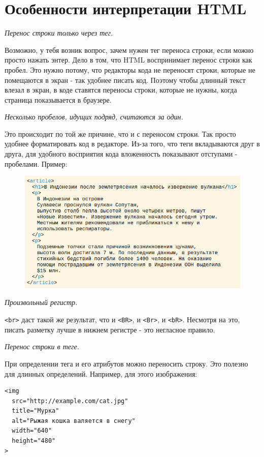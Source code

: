 \documentclass[14pt]{extreport}
\begin{document}
\section{Особенности интерпретации HTML}

\emph{Перенос строки только через тег.}

Возможно, у тебя возник вопрос, зачем нужен тег переноса строки, если можно просто нажать энтер. Дело в том, что HTML воспринимает перенос строки как пробел. Это нужно потому, что редакторы кода не переносят﻿ строки, которые не помещаются в экран - так удобнее писать код. Поэтому чтобы длинный текст влезал в экран, в коде ставятся переносы строки, которые не нужны, когда страница показывается в браузере.

\emph{Несколько пробелов, идущих подряд, считаются за один.}

Это происходит по той же причине, что и с переносом строки. Так просто удобнее форматировать код в редакторе. Из-за того, что теги вкладываются друг в друга, для удобного восприятия кода вложенность показывают отступами - пробелами. Пример:

\begin{figure}[H]
\centerline{\includegraphics[width=0.8\linewidth]{pics_practice/interpretation_HTML.png}}
\caption{}
\label{}
\end{figure}

\emph{Произвольный регистр.}

\texttt{<br>} даст такой же результат, что и \texttt{<BR>}, и \texttt{<Br>}, и \texttt{<bR>}. Несмотря на это, писать разметку лучше в нижнем регистре - это негласное правило.

\emph{Перенос строки в теге.}

При определении тега и его атрибутов можно переносить строку. Это полезно для длинных определений.
Например, для этого изображения:
\begin{verbatim}
<img
  src="http://example.com/cat.jpg"
  title="Мурка"
  alt="Рыжая кошка валяется в снегу"
  width="640"
  height="480"
>
\end{verbatim}
\end{document}
